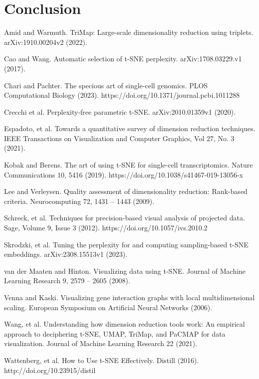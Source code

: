 \documentclass{article}
\begin{document}
\section{Conclusion}

\newpage\begin{thebibliography}{10}

Amid and Warmuth. TriMap: Large-scale dimensionality reduction using triplets. arXiv:1910.00204v2 (2022).

Cao and Wang. Automatic selection of t-SNE perplexity. arXiv:1708.03229.v1 (2017).

Chari and Pachter. The specious art of single-cell genomics. PLOS Computational Biology (2023). https://doi.org/10.1371/journal.pcbi.1011288

Crecchi et al. Perplexity-free parametric t-SNE. arXiv:2010.01359v1 (2020).

Espadoto, et al. Towards a quantitative survey of dimension reduction techniques. IEEE Transactions on Visualization and Computer Graphics, Vol 27, No. 3 (2021).

Kobak and Berens. The art of using t-SNE for single-cell transcriptomics. Nature Communications 10, 5416 (2019). https://doi.org/10.1038/s41467-019-13056-x

Lee and Verleysen. Quality assessment of dimensionality reduction: Rank-based criteria. Neurocomputing 72, 1431 -- 1443 (2009).

Schreck, et al. Techniques for precision-based visual analysis of projected data. Sage, Volume 9, Issue 3 (2012). https://doi.org/10.1057/ivs.2010.2

Skrodzki, et al. Tuning the perplexity for and computing sampling-based t-SNE embeddings. arXiv:2308.15513v1 (2023).
 
van der Maaten and Hinton. Visualizing data using t-SNE. Journal of Machine Learning Research 9, 2579 -- 2605 (2008).

Venna and Kaski. Visualizing gene interaction graphs with local multidimensional scaling. European Symposium on Artificial Neural Networks (2006).

Wang, et al. Understanding how dimension reduction tools work: An empirical approach to deciphering t-SNE, UMAP, TriMap, and PaCMAP for data visualization. Journal of Machine Learning Research 22 (2021).

Wattenberg, et al. How to Use t-SNE Effectively. Distill (2016). http://doi.org/10.23915/distil

\end{thebibliography}
\end{document}
